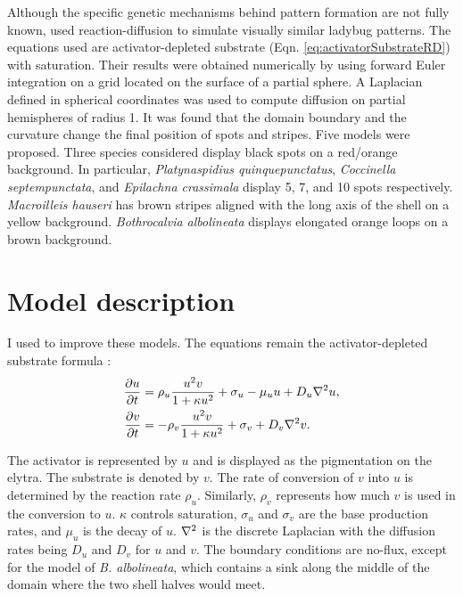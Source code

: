 Although the specific genetic mechanisms behind pattern formation are not fully known, \citet{liaw2001} used reaction-diffusion to simulate visually similar ladybug patterns. The equations used are activator-depleted substrate (Eqn. \ref{eq:activatorSubstrateRD}) with saturation. Their results were obtained numerically by using forward Euler integration on a grid located on the surface of a partial sphere. A Laplacian defined in spherical coordinates was used to compute diffusion on partial hemispheres of radius 1. It was found that the domain boundary and the curvature change the final position of spots and stripes. Five models were proposed. Three species considered display black spots on a red/orange background. In particular, \textit{Platynaspidius quinquepunctatus}, \textit{Coccinella septempunctata}, and \textit{Epilachna crassimala} display 5, 7, and 10 spots respectively. \textit{Macroilleis hauseri} has brown stripes aligned with the long axis of the shell on a yellow background. \textit{Bothrocalvia albolineata} displays elongated orange loops on a brown background.

\section{Model description} 
I used \ProgramName{} to improve these models. The equations remain the activator-depleted substrate formula \citep{meinhardt1982}:
\begin{equation}
	\begin{aligned} \label{eq:ladybugRD}
   \frac{\partial u}{\partial t} &= \rho_u \frac{u^2v}{1+\kappa u^2} + \sigma_u - \mu_u u + D_u \nabla^2 u, \\
   \frac{\partial v}{\partial t} &= -\rho_v \frac{u^2v}{1+\kappa u^2} + \sigma_v + D_v \nabla^2 v.
	\end{aligned}
\end{equation}

The activator is represented by $u$ and is displayed as the pigmentation on the elytra. The substrate is denoted by $v$. The rate of conversion of $v$ into $u$ is determined by the reaction rate $\rho_u$. Similarly, $\rho_v$ represents how much $v$ is used in the conversion to $u$. $\kappa$ controls saturation, $\sigma_u$ and $\sigma_v$ are the base production rates, and $\mu_u$ is the decay of $u$. $\nabla^2$ is the discrete Laplacian with the diffusion rates being $D_u$ and $D_v$ for $u$ and $v$. The boundary conditions are no-flux, except for the model of  \textit{B. albolineata}, which contains a sink along the middle of the domain where the two shell halves would meet.

